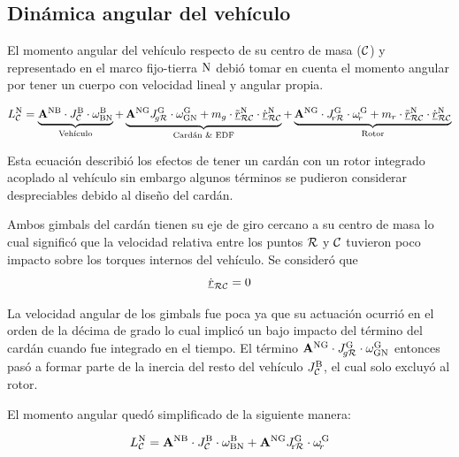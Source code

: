 \subsection{Dinámica angular del vehículo}\label{ssec:ecuacionangular}

El momento angular del vehículo respecto de su centro de masa ($\mathcal{C}$) y representado en el marco fijo-tierra $\mathrm{N}$ debió tomar en cuenta el momento angular por tener un cuerpo con velocidad lineal y angular propia. 

\begin{equation}
		L_{\mathcal{C}}^{\mathrm{N}} = \underbrace{\mathbf{A}^{\mathrm{{NB}}} \cdot J_{\mathcal{C}}^{\mathrm{B}} \cdot \omega_{\mathrm{BN}}^{\mathrm{B}}}_{\text{Vehículo}} +
		\underbrace{\mathbf{A}^{\mathrm{{NG}}}J_{\!g\mathcal{R}}^{\mathrm{G}} \cdot \omega_{\mathrm{GN}}^{\mathrm{G}} +
		 m_{g}\cdot \tilde{{ \underline{r} }}^{\mathrm{N}}_{\mathcal{RC}} \cdot\dot{{ \underline{r} }}^{\mathrm{N}}_{\mathcal{RC}} }_\text{Cardán \& EDF} + \underbrace{ \mathbf{A}^{\mathrm{NG}} \cdot J_{\!r\mathcal{R}}^{\mathrm{G}} \cdot \omega_{\!r}^{\mathrm{G}} + m_{r}\cdot \tilde{{ \underline{r} }}^{\mathrm{N}}_{\mathcal{RC}} \cdot\dot{{ \underline{r} }}^{\mathrm{N}}_{\mathcal{RC}}}_\text{Rotor}
\end{equation}

Esta ecuación describió los efectos de tener un cardán con un rotor integrado acoplado al vehículo sin embargo algunos términos se pudieron considerar despreciables debido al diseño del cardán. 

Ambos gimbals del cardán tienen su eje de giro cercano a su centro de masa lo cual significó que la velocidad relativa entre los puntos $\mathcal{R}$ y $\mathcal{C}$ tuvieron poco impacto sobre los torques internos del vehículo. Se consideró que
\begin{equation}
\dot{{ \underline{r} }}_{\mathcal{RC}}  = 0
\end{equation}

La velocidad angular de los gimbals fue poca ya que su actuación ocurrió en el orden de la décima de grado lo cual implicó un bajo impacto del término del cardán cuando fue integrado en el tiempo. El término  $\mathbf{A}^{\mathrm{NG}} \cdot J_{\!g\mathcal{R}}^{\mathrm{G}} \cdot \omega_{\mathrm{GN}}^{\mathrm{G}}$ entonces pasó a formar parte de la inercia del resto del vehículo $J_{\mathcal{C}}^{\mathrm{B}}$, el cual solo excluyó al rotor.



El momento angular quedó simplificado de la siguiente manera:


\begin{equation}
	L_{\mathcal{C}}^{\mathrm{N}} = \mathbf{A}^{\mathrm{{NB}}} \cdot J_{\mathcal{C}}^{\mathrm{B}} \cdot \omega_{\mathrm{BN}}^{\mathrm{B}} +\mathbf{A}^{\mathrm{NG}} J_{\mathcal{\!\mathrm{r}R}}^{\mathrm{G}} \cdot \omega_{\!r}^{\mathrm{G}}
\end{equation}

